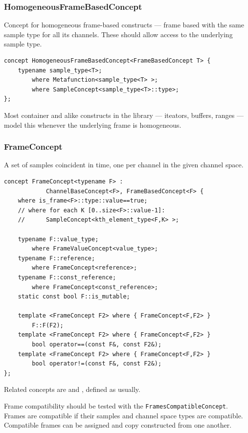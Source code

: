 \subsubsection{{HomogeneousFrameBasedConcept}}

Concept for homogeneous frame-based constructs --- frame based with
the same sample type for all its channels. These should allow access
to the underlying sample type.

\begin{lstlisting}
concept HomogeneousFrameBasedConcept<FrameBasedConcept T> {
    typename sample_type<T>;         
        where Metafunction<sample_type<T> >;
        where SampleConcept<sample_type<T>::type>;
};
\end{lstlisting}

Most container and alike constructs in the library --- iteators,
buffers, ranges --- model this whenever the underlying frame is
homogeneous.

\subsubsection{{FrameConcept}}

A set of samples coincident in time, one per channel in the given
channel space.

\begin{lstlisting}
concept FrameConcept<typename F> :
            ChannelBaseConcept<F>, FrameBasedConcept<F> {    
    where is_frame<F>::type::value==true;
    // where for each K [0..size<F>::value-1]:
    //      SampleConcept<kth_element_type<F,K> >;
        
    typename F::value_type;       
        where FrameValueConcept<value_type>;
    typename F::reference;
        where FrameConcept<reference>;
    typename F::const_reference;  
        where FrameConcept<const_reference>;
    static const bool F::is_mutable;

    template <FrameConcept F2> where { FrameConcept<F,F2> } 
        F::F(F2);
    template <FrameConcept F2> where { FrameConcept<F,F2> } 
        bool operator==(const F&, const F2&);
    template <FrameConcept F2> where { FrameConcept<F,F2> } 
        bool operator!=(const F&, const F2&);
}; 
\end{lstlisting}

Related concepts are  and
, defined as usually.

Frame compatibility should be tested with the
\texttt{Frames\-Compatible\-Concept}.  Frames are compatible if their
samples and channel space types are compatible. Compatible frames can
be assigned and copy constructed from one another.


